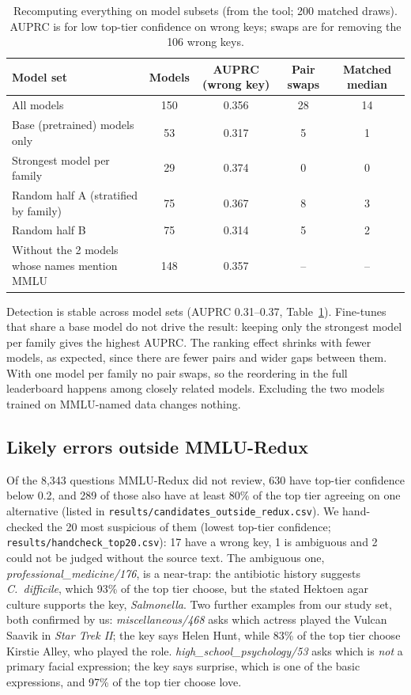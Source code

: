 \documentclass[10pt]{article}
\begin{document}
\begin{table}[!htb]
\centering\small
\caption{Recomputing everything on model subsets (from the tool; 200 matched draws). AUPRC is for
low top-tier confidence on wrong keys; swaps are for removing the 106 wrong keys.}
\label{tab:robust}
\begin{tabular}{@{}lcccc@{}}
\toprule
Model set & Models & AUPRC (wrong key) & Pair swaps & Matched median \\
\midrule
All models & 150 & 0.356 & 28 & 14 \\
Base (pretrained) models only & 53 & 0.317 & 5 & 1 \\
Strongest model per family & 29 & 0.374 & 0 & 0 \\
Random half A (stratified by family) & 75 & 0.367 & 8 & 3 \\
Random half B & 75 & 0.314 & 5 & 2 \\
Without the 2 models whose names mention MMLU & 148 & 0.357 & -- & -- \\
\bottomrule
\end{tabular}
\end{table}

Detection is stable across model sets (AUPRC 0.31--0.37, Table~\ref{tab:robust}). Fine-tunes that
share a base model do not drive the result: keeping only the strongest model per family gives the
highest AUPRC. The ranking effect shrinks with fewer models, as expected, since there are fewer pairs
and wider gaps between them. With one model per family no pair swaps, so the reordering in the full
leaderboard happens among closely related models. Excluding the two models trained on MMLU-named data
changes nothing.

\subsection{Likely errors outside MMLU-Redux}

Of the 8,343 questions MMLU-Redux did not review, 630 have top-tier confidence below 0.2, and 289 of
those also have at least 80\% of the top tier agreeing on one alternative (listed in
\texttt{results/candidates\_outside\_redux.csv}). We hand-checked the 20 most suspicious of them
(lowest top-tier confidence; \texttt{results/handcheck\_top20.csv}): 17 have a wrong key, 1 is
ambiguous and 2 could not be judged without the source text. The ambiguous one,
\emph{professional\_medicine/176}, is a near-trap: the antibiotic history suggests \emph{C.\ difficile},
which 93\% of the top tier choose, but the stated Hektoen agar culture supports the key,
\emph{Salmonella}. Two further examples from our study set, both confirmed by us:
\emph{miscellaneous/468} asks which actress played the
Vulcan Saavik in \emph{Star Trek II}; the key says Helen Hunt, while 83\% of the top tier choose Kirstie
Alley, who played the role. \emph{high\_school\_psychology/53} asks which is \emph{not} a primary facial
expression; the key says surprise, which is one of the basic expressions, and 97\% of the top tier
choose love.
\end{document}
